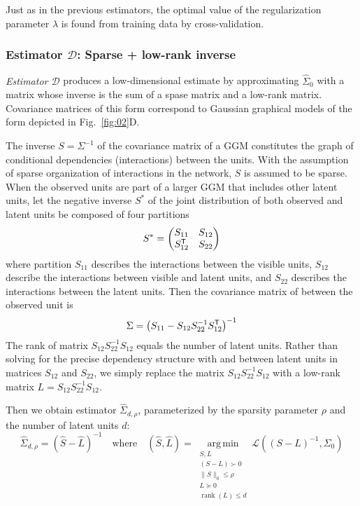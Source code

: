 \documentclass[10pt]{article}
\newcommand{\Kcomment}[1]{{\color{blue}{[KJ: #1]}}}
\newcommand{\loss}[1]{\mathcal L\left(#1\right)}
\newcommand{\T}{{\sf T}}
\DeclareMathOperator*{\argmin}{arg\,min}
\DeclareMathOperator{\rank}{rank}
\begin{document}
Just as in the previous estimators, the optimal value of the regularization parameter $\lambda$ is found from training data by cross-validation. \Kcomment{I would say this up front, so you don't have to repeat it.  Again, I think more details about cross-validation should be given.}

\subsubsection*{Estimator $\mathcal D$: Sparse + low-rank inverse}
\emph{Estimator $\mathcal D$} produces a low-dimensional estimate by approximating $\hat\Sigma_0$ with a matrix whose inverse is the sum of a spase matrix and a low-rank matrix. Covariance matrices of this form correspond to Gaussian graphical models of the form depicted in Fig.~\ref{fig:02}D.

The inverse $S=\Sigma^{-1}$ of the covariance matrix of a GGM constitutes the graph of conditional dependencies (interactions) between the units.  With the assumption of sparse organization of interactions in the network, $S$ is assumed to be sparse.  When the observed units are part of a larger GGM that includes other latent units, let the negative inverse $S^*$ of the joint distribution of both observed and latent units be composed of four partitions
\begin{equation}
S^* = 
\begin{pmatrix}
S_{11} & S_{12} \\
S_{12}^\T & S_{22} 
\end{pmatrix}
\end{equation}
where partition $S_{11}$ describes the interactions between the visible units, $S_{12}$ describe the interactions between visible and latent units, and $S_{22}$ describes the interactions between the latent units. 
Then the covariance matrix of between the observed unit is 
\begin{equation}
\Sigma = \left(S_{11} - S_{12}S_{22}^{-1}S_{12}^\T\right)^{-1}
\end{equation} 
The rank of matrix $S_{12}S_{22}^{-1}S_{12}$ equals the number of latent units. Rather than solving for the precise dependency structure with and between latent units in matrices $S_{12}$ and $S_{22}$, we simply replace the matrix $ S_{12}S_{22}^{-1}S_{12}$ with a low-rank matrix $L= S_{12}S_{22}^{-1}S_{12}$.

Then we obtain estimator $\hat\Sigma_{d,\rho}$, parameterized by the sparsity parameter $\rho$ and  the number of latent units $d$:
\begin{equation}
\hat\Sigma_{d,\rho} = \left(\hat S-\hat L\right)^{-1}
\quad\mbox{where}\quad
(\hat S, \hat L) = \argmin\limits_{\substack{S,L\\ (S-L)\succ 0 \\ \|S\|_0\le\rho \\ L\succeq 0 \\ \rank(L) \le d}} \loss{(S-L)^{-1},\Sigma_0}
\end{equation}
\end{document}
